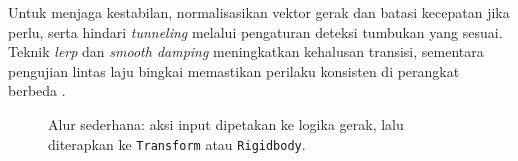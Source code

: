 \documentclass[../main.tex]{subfiles}
\begin{document}
Untuk menjaga kestabilan, normalisasikan vektor gerak dan batasi kecepatan jika perlu, serta hindari \textit{tunneling} melalui pengaturan deteksi tumbukan yang sesuai. Teknik \textit{lerp} dan \textit{smooth damping} meningkatkan kehalusan transisi, sementara pengujian lintas laju bingkai memastikan perilaku konsisten di perangkat berbeda \parencite{unity-transform}.

\begin{figure}[h]
  \centering
  \caption{Alur sederhana: aksi input dipetakan ke logika gerak, lalu diterapkan ke \texttt{Transform} atau \texttt{Rigidbody}.}
\end{figure}

\onlyinsubfile{\printbibliography}
\end{document}
